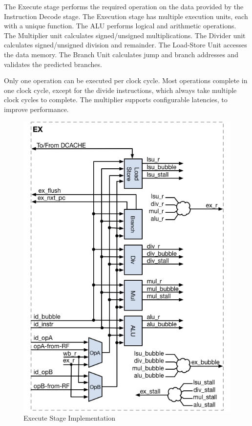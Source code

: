 The Execute stage performs the required operation on the data provided by the Instruction Decode stage.
The Execution stage has multiple execution units, each with a unique function.
The ALU performs logical and arithmetic operations.
The Multiplier unit calculates signed/unsigned multiplications.
The Divider unit calculates signed/unsigned division and remainder.
The Load-Store Unit accesses the data memory.
The Branch Unit calculates jump and branch addresses and validates the predicted branches.

Only one operation can be executed per clock cycle.
Most operations complete in one clock cycle, except for the divide instructions, which always take multiple clock cycles to complete.
The multiplier supports configurable latencies, to improve performance.


\begin{figure}[h]
  \includegraphics{assets/img/Pipeline-EX}
  \caption{Execute Stage Implementation}
\end{figure}

